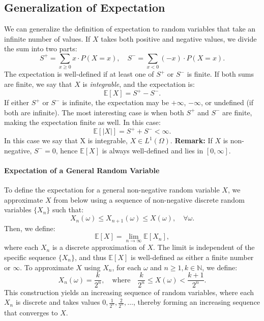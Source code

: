     \subsection{Generalization of Expectation}
    We can generalize the definition of expectation to random variables that take an infinite number of values. If $X$ takes both positive and negative values, we divide the sum into two parts: 
    \[
    S^+ = \sum_{x \geq 0} x \cdot P(X = x), \quad S^- = \sum_{x < 0} (-x) \cdot P(X = x).
    \]
    The expectation is well-defined if at least one of $S^+$ or $S^-$ is finite. If both sums are finite, we say that $X$ is \textit{integrable}, and the expectation is:
    \[
    \mathbb{E}[X] = S^+ - S^-.
    \]
    If either $S^+$ or $S^-$ is infinite, the expectation may be $+\infty$, $-\infty$, or undefined (if both are infinite). The most interesting case is when both $S^+$ and $S^-$ are finite, making the expectation finite as well. In this case:
    \[
    \mathbb{E}[|X|] = S^+ + S^- < \infty.
    \]
    In this case we say that X is integrable, $X \in L^1(\Omega)$. \newline
    \textbf{Remark:} If $X$ is non-negative, $S^- = 0$, hence $\mathbb{E}[X]$ is always well-defined and lies in $[0, \infty]$.
    
    \paragraph{Expectation of a General Random Variable}
    To define the expectation for a general non-negative random variable $X$, we approximate $X$ from below using a sequence of non-negative discrete random variables $\{X_n\}$ such that:
    \[
    X_n(\omega) \leq X_{n+1}(\omega) \leq X(\omega), \quad \forall \omega.
    \]
    Then, we define:
    \[
    \mathbb{E}[X] = \lim_{n \to \infty} \mathbb{E}[X_n],
    \]
    where each $X_n$ is a discrete approximation of $X$. \newline
    The limit is independent of the specific sequence $\{X_n\}$, and thus $\mathbb{E}[X]$ is well-defined as either a finite number or $\infty$. \newline
    To approximate $X$ using $X_n$, for each $\omega$ and $n\geq 1, k\in \mathbb{N}$, we define:
    \[
    X_n(\omega) = \frac{k}{2^n}, \quad \text{where} \quad \frac{k}{2^n} \leq X(\omega) < \frac{k+1}{2^n}.
    \]
    This construction yields an increasing sequence of random variables, where each $X_n$ is discrete and takes values $0, \frac{1}{2^n}, \frac{2}{2^n}, \dots$, thereby forming an increasing sequence that converges to $X$.
    
